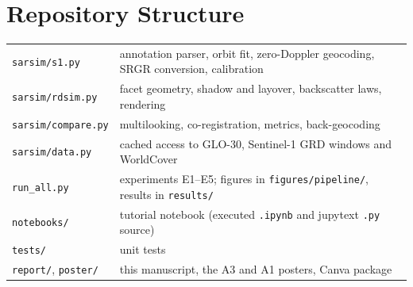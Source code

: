 \documentclass[10pt,a4paper]{article}
\begin{document}
\section{Repository Structure}
{\small
\begin{tabularx}{\textwidth}{lX}\toprule
\texttt{sarsim/s1.py} & annotation parser, orbit fit, zero-Doppler geocoding, SRGR conversion, calibration\\
\texttt{sarsim/rdsim.py} & facet geometry, shadow and layover, backscatter laws, rendering\\
\texttt{sarsim/compare.py} & multilooking, co-registration, metrics, back-geocoding\\
\texttt{sarsim/data.py} & cached access to GLO-30, Sentinel-1 GRD windows and WorldCover\\
\texttt{run\_all.py} & experiments E1--E5; figures in \texttt{figures/pipeline/}, results in \texttt{results/}\\
\texttt{notebooks/} & tutorial notebook (executed \texttt{.ipynb} and jupytext \texttt{.py} source)\\
\texttt{tests/} & unit tests\\
\texttt{report/}, \texttt{poster/} & this manuscript, the A3 and A1 posters, Canva package\\
\bottomrule\end{tabularx}\par}
\end{document}
